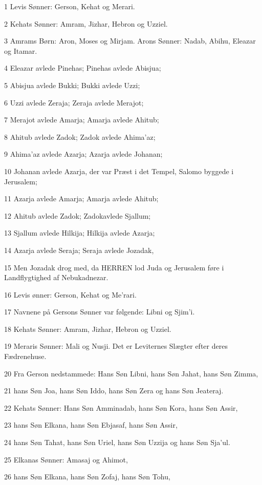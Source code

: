 \par 1 Levis Sønner: Gerson, Kehat og Merari.
\par 2 Kehats Sønner: Amram, Jizhar, Hebron og Uzziel.
\par 3 Amrams Børn: Aron, Moses og Mirjam. Arons Sønner: Nadab, Abihu, Eleazar og Itamar.
\par 4 Eleazar avlede Pinehas; Pinehas avlede Abisjua;
\par 5 Abisjua avlede Bukki; Bukki avlede Uzzi;
\par 6 Uzzi avlede Zeraja; Zeraja avlede Merajot;
\par 7 Merajot avlede Amarja; Amarja avlede Ahitub;
\par 8 Ahitub avlede Zadok; Zadok avlede Ahima'az;
\par 9 Ahima'az avlede Azarja; Azarja avlede Johanan;
\par 10 Johanan avlede Azarja, der var Præst i det Tempel, Salomo byggede i Jerusalem;
\par 11 Azarja avlede Amarja; Amarja avlede Ahitub;
\par 12 Ahitub avlede Zadok; Zadokavlede Sjallum;
\par 13 Sjallum avlede Hilkija; Hilkija avlede Azarja;
\par 14 Azarja avlede Seraja; Seraja avlede Jozadak,
\par 15 Men Jozadak drog med, da HERREN lod Juda og Jerusalem føre i Landflygtighed af Nebukadnezar.
\par 16 Levis ønner: Gerson, Kehat og Me'rari.
\par 17 Navnene på Gersons Sønner var følgende: Libni og Sjim'i.
\par 18 Kehats Sønner: Amram, Jizhar, Hebron og Uzziel.
\par 19 Meraris Sønner: Mali og Nusji. Det er Leviternes Slægter efter deres Fædrenehuse.
\par 20 Fra Gerson nedstammede: Hans Søn Libni, hans Søn Jahat, hans Søn Zimma,
\par 21 hans Søn Joa, hans Søn Iddo, hans Søn Zera og hans Søn Jeateraj.
\par 22 Kehats Sønner: Hans Søn Amminadab, hans Søn Kora, hans Søn Assir,
\par 23 hans Søn Elkana, hans Søn Ebjasaf, hans Søn Assir,
\par 24 hans Søn Tahat, hans Søn Uriel, hans Søn Uzzija og hans Søn Sja'ul.
\par 25 Elkanas Sønner: Amasaj og Ahimot,
\par 26 hans Søn Elkana, hans Søn Zofaj, hans Søn Tohu,

